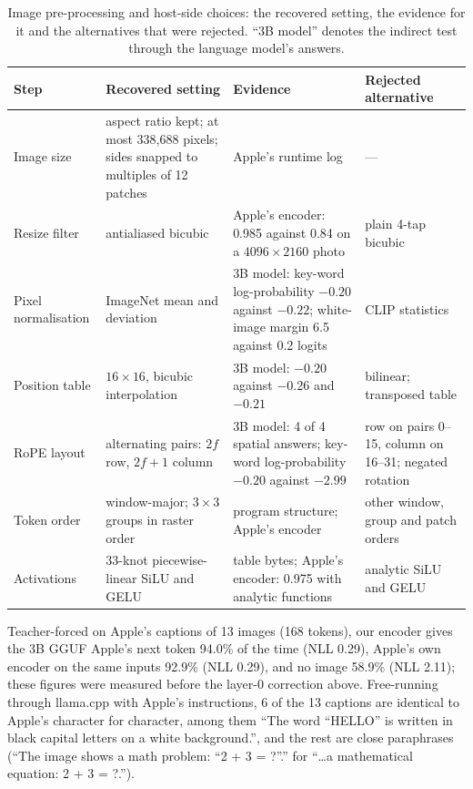 \documentclass[11pt,reqno]{amsart}
\theoremstyle{definition}
\begin{document}
\begin{table}[!htbp]
\centering\footnotesize
\begin{tabular}{@{}p{24mm}p{40mm}p{52mm}p{36mm}@{}}
\toprule
Step & Recovered setting & Evidence & Rejected alternative \\
\midrule
Image size & aspect ratio kept; at most 338{,}688 pixels; sides snapped to multiples of 12 patches & Apple's runtime log & --- \\
Resize filter & antialiased bicubic & Apple's encoder: 0.985 against 0.84 on a $4096\times2160$ photo & plain 4-tap bicubic \\
Pixel normalisation & ImageNet mean and deviation & 3B model: key-word log-probability $-0.20$ against $-0.22$; white-image margin 6.5 against 0.2 logits & CLIP statistics \\
Position table & $16\times16$, bicubic interpolation & 3B model: $-0.20$ against $-0.26$ and $-0.21$ & bilinear; transposed table \\
RoPE layout & alternating pairs: $2f$ row, $2f{+}1$ column & 3B model: 4 of 4 spatial answers; key-word log-probability $-0.20$ against $-2.99$ & row on pairs 0--15, column on 16--31; negated rotation \\
Token order & window-major; $3\times3$ groups in raster order & program structure; Apple's encoder & other window, group and patch orders \\
Activations & 33-knot piecewise-linear SiLU and GELU & table bytes; Apple's encoder: 0.975 with analytic functions & analytic SiLU and GELU \\
\bottomrule
\end{tabular}
\caption{Image pre-processing and host-side choices: the recovered setting, the evidence for it and the alternatives that were rejected. ``3B model'' denotes the indirect test through the language model's answers.}\label{tab:preproc}
\end{table}

Teacher-forced on Apple's captions of 13 images (168 tokens), our encoder gives the 3B GGUF Apple's next token 94.0\% of the time (NLL 0.29), Apple's own encoder on the same inputs 92.9\% (NLL 0.29), and no image 58.9\% (NLL 2.11); these figures were measured before the layer-0 correction above. Free-running through llama.cpp with Apple's instructions, 6 of the 13 captions are identical to Apple's character for character, among them ``The word ``HELLO'' is written in black capital letters on a white background.'', and the rest are close paraphrases (``The image shows a math problem: ``2 + 3 = ?''.'' for ``\ldots a mathematical equation: 2 + 3 = ?.'').
\end{document}
